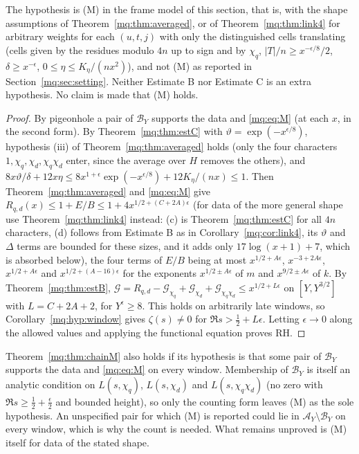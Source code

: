 The hypothesis is (M) in the frame model of this section, that is, with the shape assumptions of Theorem~\ref{mq:thm:averaged}, or of Theorem~\ref{mq:thm:link4} for arbitrary weights for each $(u,t,j)$ with only the distinguished cells translating (cells given by the residues modulo $4n$ up to sign and by $\chi_q$, $|T|/n\ge x^{-\epsilon/8}/2$, $\delta\ge x^{-\epsilon}$, $0\le\eta\le K_\eta/(nx^2)$), and not (M) as reported in Section~\ref{mq:sec:setting}. Neither Estimate B nor Estimate C is an extra hypothesis. No claim is made that (M) holds.

\begin{proof}
By pigeonhole a pair of $\mathcal B_Y$ supports the data and \eqref{mq:eq:M} (at each $x$, in the second form). By Theorem~\ref{mq:thm:estC} with $\vartheta=\exp(-x^{\epsilon/8})$, hypothesis (iii) of Theorem~\ref{mq:thm:averaged} holds (only the four characters $1,\chi_q,\chi_d,\chi_q\chi_d$ enter, since the average over $H$ removes the others), and $8x\vartheta/\delta+12x\eta\le8x^{1+\epsilon}\exp(-x^{\epsilon/8})+12K_\eta/(nx)\le1$. Then Theorem~\ref{mq:thm:averaged} and \eqref{mq:eq:M} give $R_{q,d}(x)\le1+E/B\le1+4x^{1/2+(C+2A)\epsilon}$ (for data of the more general shape use Theorem~\ref{mq:thm:link4} instead: (c) is Theorem~\ref{mq:thm:estC} for all $4n$ characters, (d) follows from Estimate B as in Corollary~\ref{mq:cor:link4}, its $\vartheta$ and $\Delta$ terms are bounded for these sizes, and it adds only $17\log(x+1)+7$, which is absorbed below), the four terms of $E/B$ being at most $x^{1/2+A\epsilon}$, $x^{-3+2A\epsilon}$, $x^{1/2+A\epsilon}$ and $x^{1/2+(A-16)\epsilon}$ for the exponents $x^{1/2\pm A\epsilon}$ of $m$ and $x^{9/2\pm A\epsilon}$ of $k$. By Theorem~\ref{mq:thm:estB}, $\mathcal G=R_{q,d}-\mathcal G_{\chi_q}+\mathcal G_{\chi_d}+\mathcal G_{\chi_q\chi_d}\le x^{1/2+L\epsilon}$ on $[Y,Y^{3/2}]$ with $L=C+2A+2$, for $Y^\epsilon\ge8$. This holds on arbitrarily late windows, so Corollary~\ref{mq:hyp:window} gives $\zeta(s)\ne0$ for $\Re s>\frac12+L\epsilon$. Letting $\epsilon\to0$ along the allowed values and applying the functional equation proves RH.
\end{proof}

\begin{remark}
Theorem~\ref{mq:thm:chainM} also holds if its hypothesis is that some pair of $\mathcal B_Y$ supports the data and \eqref{mq:eq:M} on every window. Membership of $\mathcal B_Y$ is itself an analytic condition on $L(s,\chi_q)$, $L(s,\chi_d)$ and $L(s,\chi_q\chi_d)$ (no zero with $\Re s\ge\frac12+\frac\epsilon2$ and bounded height), so only the counting form leaves (M) as the sole hypothesis. An unspecified pair for which (M) is reported could lie in $\mathcal A_Y\setminus\mathcal B_Y$ on every window, which is why the count is needed. What remains unproved is (M) itself for data of the stated shape.
\end{remark}


